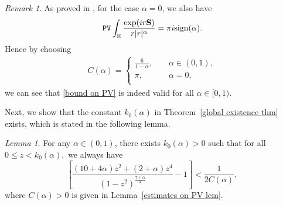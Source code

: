 \documentclass[reqno]{amsart}%
\theoremstyle{definition}
\theoremstyle{remark}
\newtheorem{rem}[thm]{Remark}
\numberwithin{equation}{section}
\newtheorem{lemma}[theorem]{Lemma}
\newcommand{\0}{\mathbf{0}}
\newcommand{\1}{\mathbf{1}}
\newcommand{\R}{\mathbb R}
\newcommand{\sgn}{\text{\rm sign}}
\newcommand{\PV}{\texttt{PV}}
\numberwithin{equation}{section}
\numberwithin{theorem}{section}
\numberwithin{figure}{section}
\begin{document}
\begin{rem}
As proved in \cite{constantin2016muskat}, for the case $\alpha=0$, we also have
\begin{align*}
\PV\int_{\R}\frac{\exp(i r \mathbf{S})}{r|r|^{\alpha}}=\pi i\sgn(\alpha). 
\end{align*}
Hence by choosing
\begin{align*}
C(\alpha)=\left \{
\begin{array}{lllll}
\frac{6}{1-\alpha},~~~~~&\alpha\in(0,1),\\
\pi,~~~~~&\alpha=0,\\
\end{array} \right.
\end{align*}
we can see that \eqref{bound on PV} is indeed valid for all $\alpha\in[0,1)$.
\end{rem}
Next, we show that the constant $k_0(\alpha)$ in Theorem~\ref{global existence thm} exists, which is stated in the following lemma.
\begin{lemma}\label{existence of k0 alpha lem}
For any $\alpha\in(0,1)$, there exists $k_0(\alpha)>0$ such that for all $0 \leq z < k_{0}(\alpha),$ we always have
\begin{equation}\label{condition for k(alpha) with x}
\left[ \frac{(10 + 4 \alpha) z^2 + (2 + \alpha) z^4}{(1 - z^2)^{\frac{7 + \alpha}{2}}} -1\right] < \frac{1}{2C(\alpha)},
\end{equation}
where $C(\alpha)>0$ is given in Lemma~\ref{estimates on PV lem}.
\end{lemma}
\end{document}
